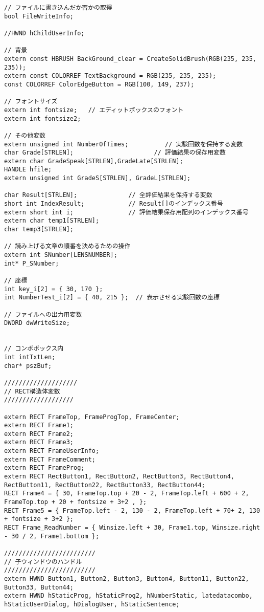 \begin{lstlisting}[caption=main.cpp]
// ファイルに書き込んだか否かの取得
bool FileWriteInfo;

//HWND hChildUserInfo;

// 背景
extern const HBRUSH BackGround_clear = CreateSolidBrush(RGB(235, 235, 235));
extern const COLORREF TextBackground = RGB(235, 235, 235);
const COLORREF ColorEdgeButton = RGB(100, 149, 237);

// フォントサイズ
extern int fontsize;   // エディットボックスのフォント
extern int fontsize2;

// その他変数
extern unsigned int NumberOfTimes;          // 実験回数を保持する変数
char Grade[STRLEN];                      // 評価結果の保存用変数
extern char GradeSpeak[STRLEN],GradeLate[STRLEN];
HANDLE hfile;
extern unsigned int GradeS[STRLEN], GradeL[STRLEN];

char Result[STRLEN];              // 全評価結果を保持する変数
short int IndexResult;            // Result[]のインデックス番号 
extern short int i;               // 評価結果保存用配列のインデックス番号
extern char temp1[STRLEN];
char temp3[STRLEN];

// 読み上げる文章の順番を決めるための操作
extern int SNumber[LENSNUMBER];
int* P_SNumber;

// 座標
int key_i[2] = { 30, 170 };         
int NumberTest_i[2] = { 40, 215 };  // 表示させる実験回数の座標

// ファイルへの出力用変数
DWORD dwWriteSize;


// コンボボックス内
int intTxtLen;
char* pszBuf;

////////////////////
// RECT構造体変数
///////////////////
 
extern RECT FrameTop, FrameProgTop, FrameCenter;
extern RECT Frame1;
extern RECT Frame2;
extern RECT Frame3;
extern RECT FrameUserInfo;
extern RECT FrameComment;
extern RECT FrameProg;
extern RECT RectButton1, RectButton2, RectButton3, RectButton4, RectButton11, RectButton22, RectButton33, RectButton44;
RECT Frame4 = { 30, FrameTop.top + 20 - 2, FrameTop.left + 600 + 2, FrameTop.top + 20 + fontsize + 3+2 , };
RECT Frame5 = { FrameTop.left - 2, 130 - 2, FrameTop.left + 70+ 2, 130 + fontsize + 3+2 };
RECT Frame_ReadNumber = { Winsize.left + 30, Frame1.top, Winsize.right - 30 / 2, Frame1.bottom };

/////////////////////////
// 子ウィンドウのハンドル
/////////////////////////
extern HWND Button1, Button2, Button3, Button4, Button11, Button22, Button33, Button44;
extern HWND hStaticProg, hStaticProg2, hNumberStatic, latedatacombo, hStaticUserDialog, hDialogUser, hStaticSentence;



\end{lstlisting}
